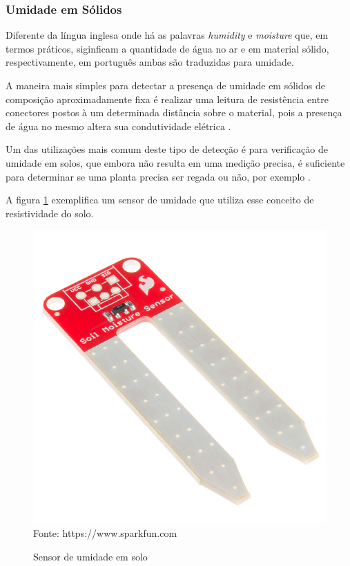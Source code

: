 \subsubsection{Umidade em Sólidos}
Diferente da língua inglesa onde há as palavras \textit{humidity} e \textit{moisture} que, em termos práticos,
siginficam a quantidade de água no ar e em material sólido, respectivamente, em português ambas são traduzidas
para umidade.

A maneira mais simples para detectar a presença de umidade em sólidos de composição aproximadamente fixa é
realizar uma leitura de resistência entre conectores postos à um determinada distância sobre o material, pois
a presença de água no mesmo altera sua condutividade elétrica \cite{sinclair2001,fraden2010}.

Um das utilizações mais comum deste tipo de detecção é para verificação de umidade em solos, que embora não
resulta em uma medição precisa, é suficiente para determinar se uma planta precisa ser regada ou não, por
exemplo \cite{sinclair2001}.

A figura \ref{figura:soil_moisture} exemplifica um sensor de umidade que utiliza esse conceito de
resistividade do solo.

\begin{figure}[h]
	\caption{Sensor de umidade em solo}
	\centering
	\includegraphics[scale=0.6]{../images/soil_moisture.jpg}
	\hspace{\linewidth}
	Fonte: https://www.sparkfun.com
	\label{figura:soil_moisture}
\end{figure}

